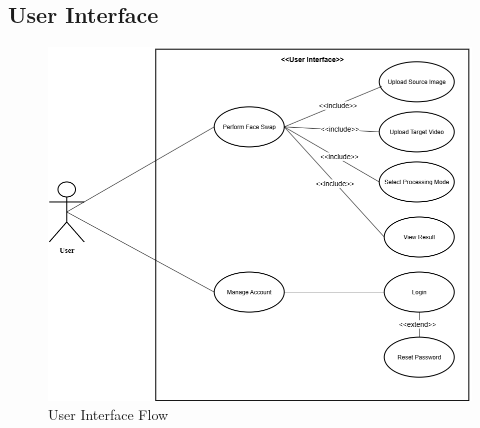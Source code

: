 \documentclass[12pt,a4paper]{report}
\begin{document}
\subsection{User Interface}
\begin{figure}[H]
\centering
\includegraphics[width=1.1\textwidth]{figures/user_interface_diagram.png}
\caption{User Interface Flow}
\label{fig:user_interface}
\end{figure}
\end{document}
